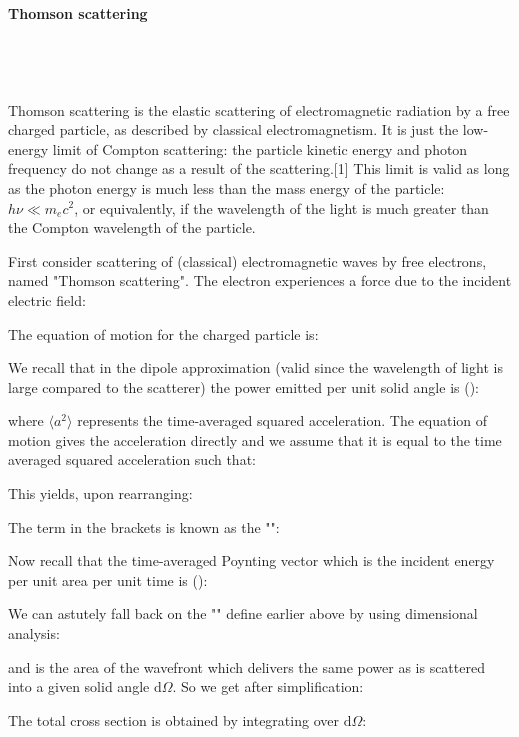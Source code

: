 	\paragraph{Thomson scattering}\mbox{}\\\\\\
	Thomson scattering is the elastic scattering of electromagnetic radiation by a free charged particle, as described by classical electromagnetism. It is just the low-energy limit of Compton scattering: the particle kinetic energy and photon frequency do not change as a result of the scattering.[1] This limit is valid as long as the photon energy is much less than the mass energy of the particle: $h\nu \ll m_ec^{2}$, or equivalently, if the wavelength of the light is much greater than the Compton wavelength of the particle.
	
	First consider scattering of (classical) electromagnetic waves by free electrons, named "Thomson scattering". The electron experiences a force due to the incident electric field:
	
	The equation of motion for the charged particle is:
	
	We recall that in the dipole approximation (valid since the wavelength of light is large compared to the scatterer) the power emitted per unit solid angle is ():
	
	where $\langle a^2 \rangle$ represents the time-averaged squared acceleration. The equation of motion gives the acceleration directly and we assume that it is equal to the time averaged squared acceleration such that:
	
	This yields, upon rearranging:
	
	The term in the brackets is known as the "":
	
	Now recall that the time-averaged Poynting vector which is the incident energy per unit area per unit time is ():
	
	We can astutely fall back on the "" define earlier above by using dimensional analysis:
	
	and is the area of the wavefront which delivers the same power as is scattered into a given solid angle $\mathrm{d}\Omega$. So we get after simplification:
	
	The total cross section is obtained by integrating over $\mathrm{d}\Omega$:
	
